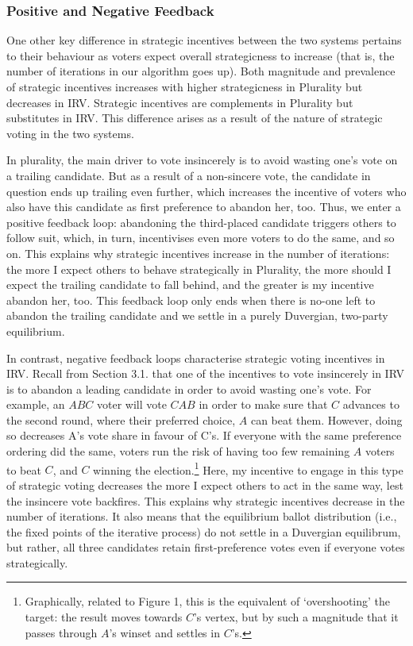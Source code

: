 \documentclass[11pt, letter]{article}
\begin{document}
\subsubsection{Positive and Negative Feedback}

One other key difference in strategic incentives between the two systems pertains to their behaviour as voters expect overall strategicness to increase (that is, the number of iterations in our algorithm goes up). Both magnitude and prevalence of strategic incentives increases with higher strategicness in Plurality but decreases in IRV. Strategic incentives are complements in Plurality but substitutes in IRV. This difference arises as a result of the nature of strategic voting in the two systems.

In plurality, the main driver to vote insincerely is to avoid wasting one's vote on a trailing candidate. But as a result of a non-sincere vote, the candidate in question ends up trailing even further, which increases the incentive of voters who also have this candidate as first preference to abandon her, too. Thus, we enter a positive feedback loop: abandoning the third-placed candidate triggers others to follow suit, which, in turn, incentivises even more voters to do the same, and so on. This explains why strategic incentives increase in the number of iterations: the more I expect others to behave strategically in Plurality, the more should I expect the trailing candidate to fall behind, and the greater is my incentive abandon her, too. This feedback loop only ends when there is no-one left to abandon the trailing candidate and we settle in a purely Duvergian, two-party equilibrium.

In contrast, negative feedback loops characterise strategic voting incentives in IRV. Recall from Section 3.1. that one of the incentives to vote insincerely in IRV is to abandon a leading candidate in order to avoid wasting one's vote. For example, an $ABC$ voter will vote $CAB$ in order to make sure that $C$ advances to the second round, where their preferred choice, $A$ can beat them. However, doing so decreases A's vote share in favour of C's. If everyone with the same preference ordering did the same, voters run the risk of having too few remaining $A$ voters to beat $C$, and $C$ winning the election.\footnote{Graphically, related to Figure 1, this is the equivalent of `overshooting' the target: the result moves towards $C$'s vertex, but by such a magnitude that it passes through $A$'s winset and settles in $C$'s.} Here, my incentive to engage in this type of strategic voting decreases the more I expect others to act in the same way, lest the insincere vote backfires. This explains why strategic incentives decrease in the number of iterations. It also means that the equilibrium ballot distribution (i.e., the fixed points of the iterative process) do not settle in a Duvergian equilibrum, but rather, all three candidates retain first-preference votes even if everyone votes strategically.
\end{document}
